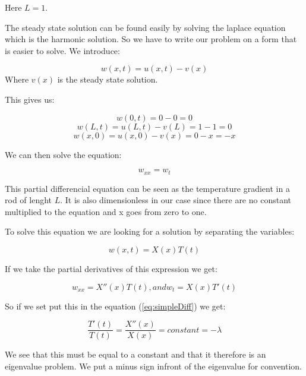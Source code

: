 \documentclass[a4paper,10pt]{article}
\begin{document}
Here $L=1$.

The steady state solution can be found easily by solving the laplace equation which is the harmonic solution. So we have to write our problem on 
a form that is easier to solve. We introduce:

\begin{equation}
 w(x,t) = u(x,t) - v(x)
 \label{WritingEasier}
\end{equation}
Where $v(x)$ is the steady state solution.

This gives us:

\begin{equation}
 w(0,t) = 0 - 0 = 0
\end{equation}
\begin{equation}
w(L,t) = u(L,t) - v(L) = 1 -1 = 0  
\end{equation}
\begin{equation}
 w(x,0) = u(x,0) - v(x) = 0 -x = -x
\end{equation}

We can then solve the equation:

\begin{equation}
 w_{xx}=w_t
 \label{eq:simpleDiff}
\end{equation}

This partial differencial equation can be seen as the temperature gradient in a rod of lenght $L$. It is also dimensionless in our case
since there are no constant multiplied to the equation and x goes from zero to one.

To solve this equation we are looking for a solution by separating the variables:

\begin{equation}
w(x,t) = X(x)T(t)
\label{eq:seperating}
\end{equation}

If we take the partial derivatives of this expression we get:

\begin{equation}
w_{xx} = X''(x)T(t) ,and w_t = X(x)T'(t)
\label{eq:deriv}
\end{equation}

So if we set put this in the equation (\ref{eq:simpleDiff}) we get:

\begin{equation}
\frac{T'(t)}{T(t)} = \frac{X''(x)}{X(x)} = constant = -\lambda
\label{eq:eigValue}
\end{equation}

We see that this must be equal to a constant and that it therefore is an eigenvalue problem. We put a minus sign infront of the eigenvalue for convention.
\end{document}
